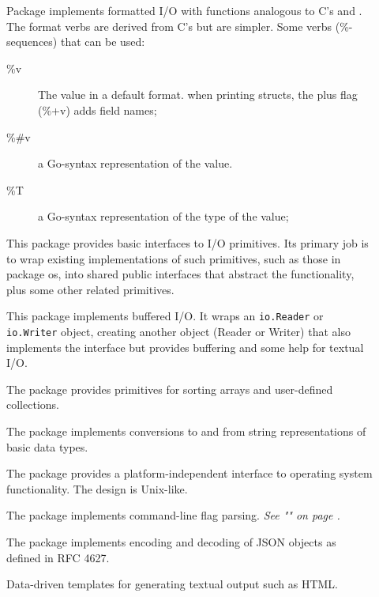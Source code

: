 \begin{description}
\item[]{
Package  implements formatted I/O with functions analogous
to C's  and . The format verbs are derived
from C's but are simpler. Some verbs (\%-sequences) that can be used:

\begin{description}
\item[\%v]{The value in a default format.
when printing structs, the plus flag (\%+v) adds field names;}
\item[\%\#v]{a Go-syntax representation of the value.}
\item[\%T]{a Go-syntax representation of the type of the value;}
\end{description}

}

\item[]{
This package provides basic interfaces to I/O primitives.
Its primary job is to wrap existing implementations of such primitives,
such as those in package os, into shared public interfaces that
abstract the functionality, plus some other related primitives.
}
\item[]{
This package implements buffered I/O.  It wraps an 
\lstinline{io.Reader}
or
\lstinline{io.Writer}
object, creating another object (Reader or Writer) that also implements
the interface but provides buffering and some help for textual I/O.
}
\item[]{
The  package provides primitives for sorting arrays
and user-defined collections.
}
\item[]{
The  package implements conversions to and from
string representations of basic data types.
}
\item[]{
The  package provides a platform-independent interface to operating
system functionality.  The design is Unix-like.
}
\item[]{
The  package implements command-line flag parsing. 
\emph{See ""
on page \pageref{sec:option parsing}.}
}
\item[]{
The  package implements encoding and decoding of JSON objects as
defined in RFC 4627.
}
\item[]{
Data-driven templates for generating textual output such as HTML.

}
\end{description}
